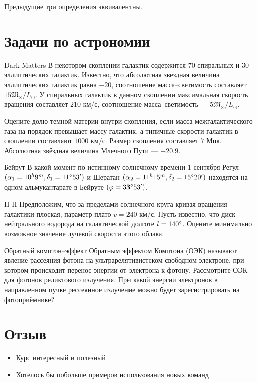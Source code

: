 \documentclass[11pt]{article}
\begin{document}
	\begin{thm}
	Предыдущие три определения эквивалентны.
	\end{thm}
    \section{Задачи по астрономии}
    \begin{problem} {Dark Matters}
    В некотором скоплении галактик содержится $70$ спиральных и $30$ эллиптических галактик. Известно, что абсолютная звездная величина эллиптических галактик равна  $-20$, соотношение масса--светимость составляет $15\mathfrak{M}_\odot / L_\odot$. У спиральных галактик  в данном скоплении максимальная скорость вращения составляет $210$ км/с, соотношение масса--светимость --- $5\mathfrak{M}_\odot / L_\odot$.\par
    Оцените долю темной материи внутри скопления, если масса межгалактического газа на порядок превышает массу галактик, а типичные скорости галактик в скоплении составляют $1000$ км/с. Размер скопления составляет $7$ Мпк. Абсолютная звёздная величина Млечного Пути --- $-20.9$.
    \end{problem}
    \begin{problem} {Бейрут}
    В какой момент по истинному солнечному времени $1$ сентября Регул $(\alpha_1 = 10^h9^m, \delta_1 = 11\degree 53')$ и Шератан $(\alpha_2 = 11^h15^m, \delta_2 = 15\degree 20')$ находятся на одном альмукантарате в Бейруте $(\varphi = 33\degree53')$.
    \end{problem}
    \begin{problem} {H II}
    Предположим, что за пределами солнечного круга кривая вращения галактики плоская, параметр плато $v = 240$ км/с. Пусть известно, что диск нейтрального водорода на галактической долготе $l = 140\degree$. Оцените минимально возможное значение лучевой скорости этого облака.
    \end{problem}
    \begin{problem} {Обратный комптон--эффект}
    Обратным эффектом Комптона (ОЭК) называют явление рассеяния фотона на ультрарелятивистском свободном электроне, при котором происходит  перенос энергии от электрона к фотону. Рассмотрите ОЭК для фотонов реликтового излучения. При какой энергии электронов в направленном пучке рессеянное излучение можно будет зарегистрировать на фотоприёмнике?
    \end{problem}
    \section{Отзыв}
    \renewcommand{\labelitemi}{$\diamond$}
    \begin{itemize}
    	\item Курс интересный и полезный
    	\item Хотелось бы побольше примеров использования новых команд
    \end{itemize}
\end{document}
